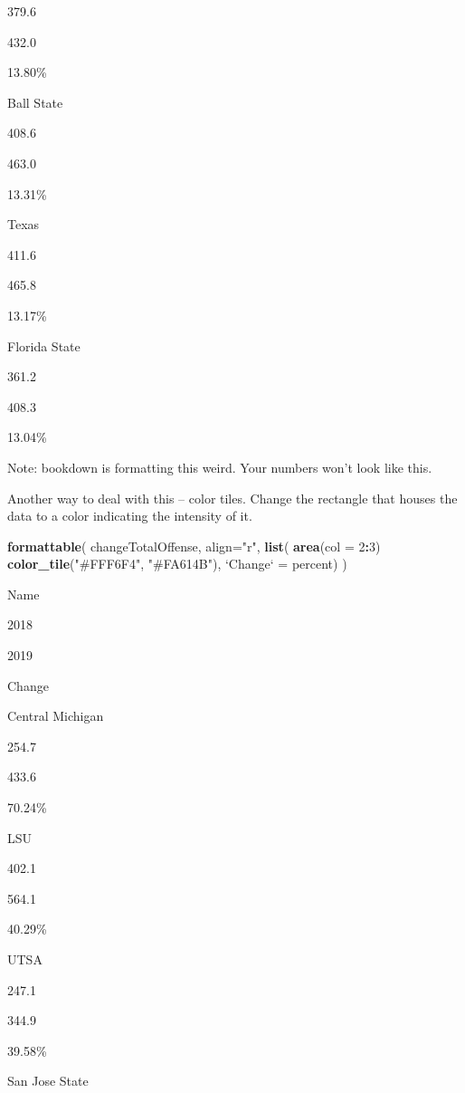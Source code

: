 \documentclass[]{book}
\newenvironment{Shaded}{\begin{snugshade}}{\end{snugshade}}
\newcommand{\DataTypeTok}[1]{\textcolor[rgb]{0.13,0.29,0.53}{#1}}
\newcommand{\DecValTok}[1]{\textcolor[rgb]{0.00,0.00,0.81}{#1}}
\newcommand{\KeywordTok}[1]{\textcolor[rgb]{0.13,0.29,0.53}{\textbf{#1}}}
\newcommand{\NormalTok}[1]{#1}
\newcommand{\OperatorTok}[1]{\textcolor[rgb]{0.81,0.36,0.00}{\textbf{#1}}}
\newcommand{\StringTok}[1]{\textcolor[rgb]{0.31,0.60,0.02}{#1}}
\begin{document}
{379.6}

{432.0}

13.80\%

Ball State

{408.6}

{463.0}

13.31\%

Texas

{411.6}

{465.8}

13.17\%

Florida State

{361.2}

{408.3}

13.04\%

Note: bookdown is formatting this weird. Your numbers won't look like this.

Another way to deal with this -- color tiles. Change the rectangle that houses the data to a color indicating the intensity of it.

\begin{Shaded}
\begin{Highlighting}[]
\KeywordTok{formattable}\NormalTok{(}
\NormalTok{  changeTotalOffense, }
  \DataTypeTok{align=}\StringTok{"r"}\NormalTok{,}
  \KeywordTok{list}\NormalTok{(}
     \KeywordTok{area}\NormalTok{(}\DataTypeTok{col =} \DecValTok{2}\OperatorTok{:}\DecValTok{3}\NormalTok{) }\OperatorTok{~}\StringTok{ }\KeywordTok{color_tile}\NormalTok{(}\StringTok{"#FFF6F4"}\NormalTok{, }\StringTok{"#FA614B"}\NormalTok{),}
    \StringTok{`}\DataTypeTok{Change}\StringTok{`}\NormalTok{ =}\StringTok{ }\NormalTok{percent)}
\NormalTok{  )}
\end{Highlighting}
\end{Shaded}

Name

2018

2019

Change

Central Michigan

{254.7}

{433.6}

70.24\%

LSU

{402.1}

{564.1}

40.29\%

UTSA

{247.1}

{344.9}

39.58\%

San Jose State
\end{document}
